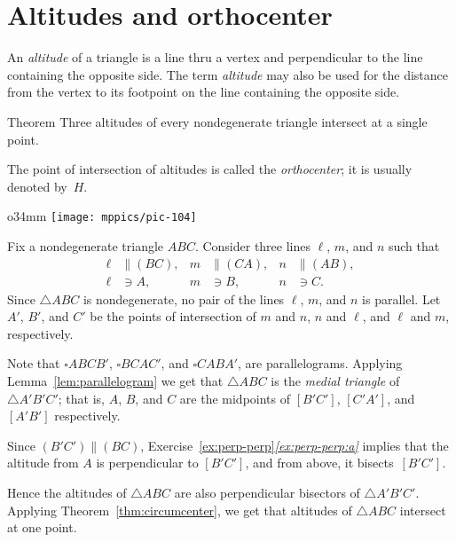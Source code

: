 \section{Altitudes and orthocenter}

An \emph{altitude} of a triangle is a line thru a vertex and perpendicular to the line containing the opposite side.
The term \emph{altitude} may also be used for the distance from the vertex to its footpoint on the line containing the opposite side.

\begin{thm}{Theorem}\label{thm:orthocenter}
Three altitudes of every nondegenerate triangle intersect at a single point.
\end{thm}

The point of intersection of altitudes is called the \emph{orthocenter}; 
it is usually denoted by~$H$.

{

\begin{wrapfigure}{o}{34mm}
\vskip-4mm
\centering
\texttt{[image: mppics/pic-104]}
\end{wrapfigure}

Fix a nondegenerate triangle $A B C$.
Consider three lines $\ell$, $m$, and $n$
such that 
\begin{align*}
\ell&\parallel(BC),
&
m&\parallel(CA),
&
n&\parallel(AB),
\\
\ell&\ni A,
&
m&\ni B,
&
n&\ni C.
\end{align*}
Since $\triangle A B C$ is nondegenerate,
no pair of the lines $\ell$, $m$, and $n$ is parallel.
Let $A'$, $B'$, and $C'$ be the points of intersection of
$m$ and $n$, $n$ and $\ell$, and $\ell$ and $m$, respectively.

}

Note that $\square A B C B'$, $\square B C A C'$, and $\square C A B A'$, are parallelograms.
Applying Lemma~\ref{lem:parallelogram} we get that $\triangle ABC$ is the \emph{medial triangle} of $\triangle A' B' C'$;
that is, $A$, $B$, and $C$ are the midpoints of $[B' C']$, $[C' A']$, and $[A' B']$ respectively.

Since $(B' C')\parallel (BC)$, Exercise~\ref{ex:perp-perp}\textit{\ref{ex:perp-perp:a}} implies that the altitude from $A$ is perpendicular to $[B' C']$, and from above, it bisects~$[B' C']$.

Hence the altitudes of $\triangle A B C$ 
are also perpendicular bisectors of $\triangle A' B' C'$.
Applying Theorem~\ref{thm:circumcenter}, we get that altitudes of $\triangle ABC$ intersect at one point.
\qeds

